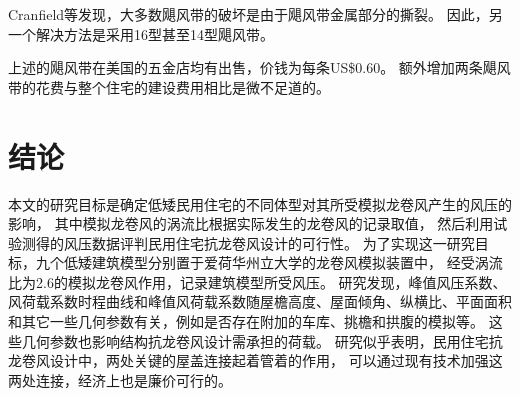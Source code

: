 \documentclass{ctexart}
\begin{document}
Cranfield等\cite{canfield1991uplift}发现，大多数飓风带的破坏是由于飓风带金属部分的撕裂。
因此，另一个解决方法是采用16型甚至14型飓风带。

上述的飓风带在美国的五金店均有出售，价钱为每条US\$0.60。
额外增加两条飓风带的花费与整个住宅的建设费用相比是微不足道的。 	


\section{结论}
本文的研究目标是确定低矮民用住宅的不同体型对其所受模拟龙卷风产生的风压的影响，
其中模拟龙卷风的涡流比根据实际发生的龙卷风的记录取值，
然后利用试验测得的风压数据评判民用住宅抗龙卷风设计的可行性。
为了实现这一研究目标，九个低矮建筑模型分别置于爱荷华州立大学的龙卷风模拟装置中，
经受涡流比为\num{2.6}的模拟龙卷风作用，记录建筑模型所受风压。
研究发现，峰值风压系数、风荷载系数时程曲线和峰值风荷载系数随屋檐高度、屋面倾角、纵横比、平面面积
和其它一些几何参数有关，例如是否存在附加的车库、挑檐和拱腹的模拟等。
这些几何参数也影响结构抗龙卷风设计需承担的荷载。
研究似乎表明，民用住宅抗龙卷风设计中，两处关键的屋盖连接起着管着的作用，
可以通过现有技术加强这两处连接，经济上也是廉价可行的。

\printbibliography
\end{document}
